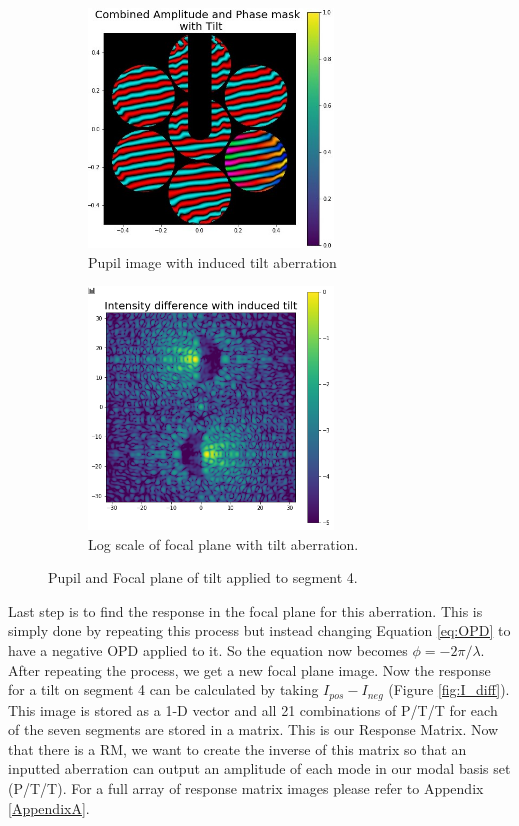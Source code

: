 \begin{figure}[H]
\centering
\begin{subfigure}{.5\textwidth}
  \centering
  \includegraphics[width=6.5cm]{Figures/tilt_comb.jpg}
  \caption{Pupil image with induced tilt aberration}
  \label{fig:tilt_pupil}
\end{subfigure}%
\begin{subfigure}{.5\textwidth}
  \centering
  \includegraphics[width=6.5cm]{Figures/PSF_tilt.png}
  \caption{Log scale of focal plane with tilt aberration.}
  \label{fig:tilt_focal}
\end{subfigure}
\caption{Pupil and Focal plane of tilt applied to segment 4.}
\label{fig:abb_images}
\end{figure}

Last step is to find the response in the focal plane for this aberration.  This is simply done by repeating this
process but instead changing Equation \ref{eq:OPD} to have a negative OPD applied to it.  So the equation now
becomes $\phi = -2 \pi / \lambda$.  After repeating the process, we get a new focal plane image.  Now the response
for a tilt on segment 4 can be calculated by taking $I_{pos} - I_{neg}$ (Figure \ref{fig:I_diff}).  This image is
stored as a 1-D vector and all 21 combinations of P/T/T for each of the seven segments are stored in a matrix.  This
is our Response Matrix.  Now that there is a RM, we want to create the inverse of this matrix so that an inputted
aberration can output an amplitude of each mode in our modal basis set (P/T/T).  For a full array of response matrix images please refer to Appendix \ref{AppendixA}.


